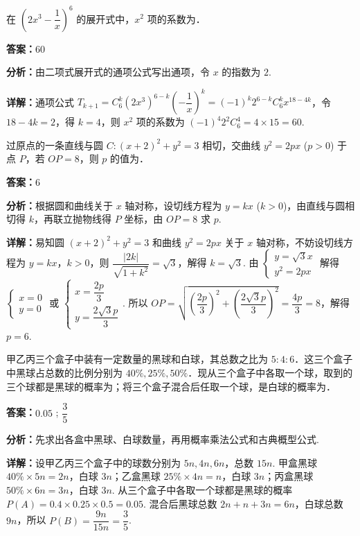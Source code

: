 \begin{question}[points=5]
在 $\left(2x^3 - \dfrac{1}{x}\right)^6$ 的展开式中，$x^2$ 项的系数为．
\fillin[{$60$}]
\begin{solution}
\textbf{答案：}$60$

\textbf{分析：}由二项式展开式的通项公式写出通项，令 $x$ 的指数为 $2$.

\textbf{详解：}通项公式 $T_{k+1} = C_6^k (2x^3)^{6-k} \left(-\dfrac{1}{x}\right)^k = (-1)^k 2^{6-k} C_6^k x^{18-4k}$，令 $18-4k=2$，得 $k=4$，则 $x^2$ 项的系数为 $(-1)^4 2^{2} C_6^4 = 4 \times 15 = 60$.
\end{solution}
\end{question}

\begin{question}[points=5]
过原点的一条直线与圆 $C: (x+2)^2 + y^2 = 3$ 相切，交曲线 $y^2 = 2px$ ($p > 0$) 于点 $P$，若 $OP = 8$，则 $p$ 的值为．
\fillin[{$6$}]
\begin{solution}
\textbf{答案：}$6$

\textbf{分析：}根据圆和曲线关于 $x$ 轴对称，设切线方程为 $y = kx$ ($k>0$)，由直线与圆相切得 $k$，再联立抛物线得 $P$ 坐标，由 $OP=8$ 求 $p$.

\textbf{详解：}易知圆 $(x+2)^2 + y^2 = 3$ 和曲线 $y^2 = 2px$ 关于 $x$ 轴对称，不妨设切线方程为 $y = kx$，$k > 0$，则 $\dfrac{|2k|}{\sqrt{1+k^2}} = \sqrt{3}$，解得 $k = \sqrt{3}$. 由 $\begin{cases} y = \sqrt{3}x \\ y^2 = 2px \end{cases}$ 解得 $\begin{cases} x = 0 \\ y = 0 \end{cases}$ 或 $\begin{cases} x = \dfrac{2p}{3} \\ y = \dfrac{2\sqrt{3}p}{3} \end{cases}$. 所以 $OP = \sqrt{\left(\dfrac{2p}{3}\right)^2 + \left(\dfrac{2\sqrt{3}p}{3}\right)^2} = \dfrac{4p}{3} = 8$，解得 $p=6$.
\end{solution}
\end{question}

\begin{question}[points=5]
甲乙丙三个盒子中装有一定数量的黑球和白球，其总数之比为 $5:4:6$．这三个盒子中黑球占总数的比例分别为 $40\%, 25\%, 50\%$．现从三个盒子中各取一个球，取到的三个球都是黑球的概率为；将三个盒子混合后任取一个球，是白球的概率为．
\fillin[{$0.05$ ; $\dfrac{3}{5}$}]
\begin{solution}
\textbf{答案：}$0.05$ ; $\dfrac{3}{5}$

\textbf{分析：}先求出各盒中黑球、白球数量，再用概率乘法公式和古典概型公式.

\textbf{详解：}设甲乙丙三个盒子中的球数分别为 $5n,4n,6n$，总数 $15n$. 甲盒黑球 $40\% \times 5n = 2n$，白球 $3n$；乙盒黑球 $25\% \times 4n = n$，白球 $3n$；丙盒黑球 $50\% \times 6n = 3n$，白球 $3n$. 从三个盒子中各取一个球都是黑球的概率 $P(A) = 0.4 \times 0.25 \times 0.5 = 0.05$. 混合后黑球总数 $2n + n + 3n = 6n$，白球总数 $9n$，所以 $P(B) = \dfrac{9n}{15n} = \dfrac{3}{5}$.
\end{solution}
\end{question}

